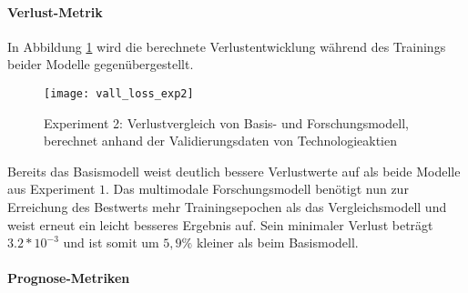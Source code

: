 \paragraph*{Verlust-Metrik} 
In Abbildung \ref{fig:vall_loss_exp2} wird die berechnete Verlustentwicklung während des Trainings beider Modelle gegenübergestellt.
\begin{figure}[H]
	\texttt{[image: vall\_loss\_exp2]}
	\caption{Experiment 2: Verlustvergleich von Basis- und Forschungsmodell, berechnet anhand der Validierungsdaten von Technologieaktien}
	\label{fig:vall_loss_exp2}
\end{figure}
Bereits das Basismodell weist deutlich bessere Verlustwerte auf als beide Modelle aus Experiment $1$. Das multimodale Forschungsmodell benötigt nun zur Erreichung des Bestwerts mehr Trainingsepochen als das Vergleichsmodell und weist erneut ein leicht besseres Ergebnis auf. Sein minimaler Verlust beträgt $3.2*10^{-3}$ und ist somit um $5,9\%$ kleiner als beim Basismodell.

\paragraph*{Prognose-Metriken} 

